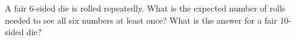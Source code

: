 A fair $6$-sided die is rolled repeatedly. What is the expected number of rolls needed to see all six numbers at least once? What is the answer for a fair $10$-sided die?
